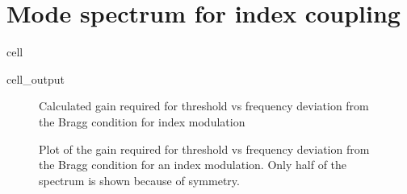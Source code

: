 \documentclass[a4paper,10pt,english,openany,oneside]{jupyterBook}
\begin{document}
\section{Mode spectrum for index coupling}
\label{\detokenize{Kogelnik-Shank_Coupled-Wave-Theory_DFB-Lasers:mode-spectrum-for-index-coupling}}
\begin{sphinxuseclass}{cell}\begin{sphinxVerbatimOutput}

\begin{sphinxuseclass}{cell_output}
\begin{figure}[htbp]
\centering
\capstart

\noindent{}
\caption{Calculated gain required for threshold vs frequency deviation from the Bragg condition for index modulation}\label{\detokenize{Kogelnik-Shank_Coupled-Wave-Theory_DFB-Lasers:kogelnik5c}}\end{figure}

\end{sphinxuseclass}\end{sphinxVerbatimOutput}

\end{sphinxuseclass}
\begin{figure}[htbp]
\centering
\capstart

\noindent{}
\caption{Plot of the gain required for threshold vs frequency deviation from the Bragg condition for an index modulation. Only half of the spectrum is shown because of symmetry.}\label{\detokenize{Kogelnik-Shank_Coupled-Wave-Theory_DFB-Lasers:kogelnik5}}\end{figure}
\end{document}
